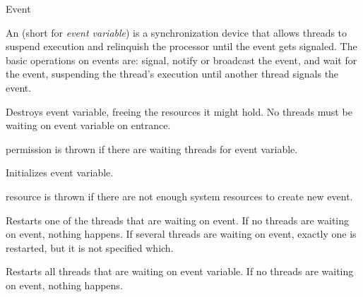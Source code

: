 
\begin{classpage}{Event}

An  (short for {\em event variable}) is a
synchronization device that allows threads to suspend execution and
relinquish the processor until the event gets signaled.
The basic operations on events are: signal, notify or broadcast the event,
and wait for the event, suspending the thread's execution until another thread signals the event.


\begin{mandescription}
  \destructor
  Destroys  event variable, freeing the resources it
  might hold. No threads must be waiting on  event
  variable on entrance.
  \begin{exception}
    \item[permission] is thrown if there are waiting
      threads for  event variable.
  \end{exception}

  \constructor{}
  Initializes  event variable.
  \begin{exception}
    \item[resource] is thrown if there are not
      enough system resources to create  new event.
  \end{exception}

  Restarts one of the threads that are waiting on 
  event. If no threads are waiting on  event,
  nothing happens. If several threads are waiting on 
  event, exactly one is restarted, but it is not specified
  which.

  Restarts all threads that are waiting on  event
  variable. If no threads are waiting on  event,
  nothing happens.


\end{mandescription}
\end{classpage}
